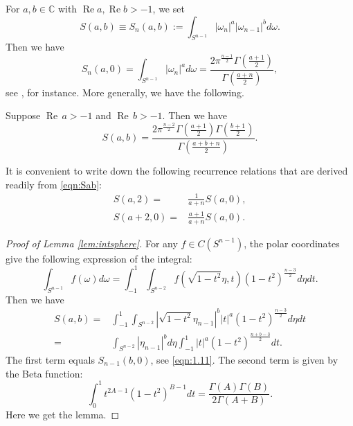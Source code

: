 For $a,b \in {\mathbb{C}}$
 with $\operatorname{Re} a, \operatorname{Re} b>-1$, 
 we set
\begin{equation}
\label{eqn:intsphere}
S(a,b) 
\equiv
S_n(a,b)
:=
\int_{S^{n-1}} |\omega_n|^a |\omega_{n-1}|^b d \omega.  
\end{equation}
Then we have 
\begin{equation}
   S_n(a,0) = \int_{S^{n-1}} |\omega_n|^a d \omega
=
\frac{2 \pi^{\frac {n-1}{2}} \Gamma(\frac{a+1}{2})}{\Gamma(\frac{a+n}{2})}, 
\label{eqn:1.11}
\end{equation}
see \cite[Lemma 7.6]{sbon}, 
 for instance.  
More generally,
 we have the following.  
\begin{lemma}
\label{lem:intsphere}
Suppose ${\operatorname{Re}}\, a >-1$ and ${\operatorname{Re}}\, b >-1$.  
Then we have 
\begin{equation}
\label{eqn:Sab}
S(a,b)=
\frac
{2 \pi^{\frac{n-2}{2}}
\Gamma(\frac{a+1}{2})\Gamma(\frac{b+1}{2})}{\Gamma(\frac{a+b+n}{2})}.  
\end{equation}
\end{lemma}
It is convenient to write down the following recurrence relations
 that are derived readily from \eqref{eqn:Sab}:
\begin{align}
\label{eqn:Sab2}
S(a,2)=&
\frac{1}{a+n}S(a,0), 
\\
\label{eqn:Sab3}
S(a+2,0)=&
\frac{a+1}{a+n}S(a,0).  
\end{align}

\begin{proof}
[Proof of Lemma \ref{lem:intsphere}]
For any $f \in C(S^{n-1})$, 
 the polar coordinates give the following expression
 of the integral:
\begin{equation}
\int_{S^{n-1}} f (\omega) d \omega
=\int_{-1}^{1} \int_{S^{n-2}} 
 f(\sqrt{1-t^2} \eta, t) (1-t^2)^{\frac {n-3}{2}} d \eta d t.
\label{eqn:polarS}
\end{equation}
Then we have
\begin{align*}
S(a,b)
=& \int_{-1}^1 \int_{S^{n-2}}
  |\sqrt{1-t^2} \eta_{n-1} |^b |t|^a (1-t^2)^{\frac{n-3}{2}} d\eta d t 
\\
=& \int_{S^{n-2}}
  |\eta_{n-1}|^b d \eta \int_{-1}^1 |t|^a (1-t^2)^{\frac{n+b-3}{2}} d t. 
\end{align*}
The first term equals $S_{n-1}(b,0)$, 
 see \eqref{eqn:1.11}.  
The second term is given by the Beta function:
\begin{equation}
\int_{0}^{1} t^{2A-1}(1-t^2)^{B-1} d t 
=\frac{\Gamma(A)\Gamma(B)}{2\Gamma(A+B)}.  
\label{eqn:Beta}
\end{equation}
Here we get the lemma.  
\end{proof}

